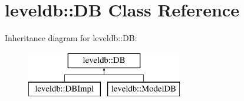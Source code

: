 \hypertarget{classleveldb_1_1_d_b}{}\section{leveldb\+:\+:DB Class Reference}
\label{classleveldb_1_1_d_b}
Inheritance diagram for leveldb\+:\+:DB\+:\begin{figure}[H]
\begin{center}
\leavevmode
\includegraphics[height=2.000000cm]{classleveldb_1_1_d_b}
\end{center}
\end{figure}
